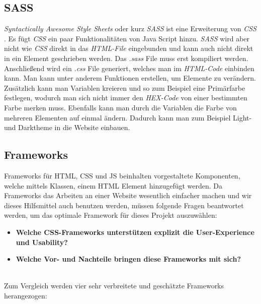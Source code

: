 	\subsection{SASS}
	\label{chapter:study-frontend-sass}
	\textit{Syntactically Awesome Style Sheets} oder kurz \textit{SASS} ist eine Erweiterung von \textit{CSS} \cite{jump-start-sass}. Es fügt \textit{CSS} ein paar Funktionalitäten von Java Script hinzu. \textit{SASS} wird aber nicht wie \textit{CSS} direkt in das \textit{HTML-File} eingebunden und kann auch nicht direkt in ein Element geschrieben werden. Das \textit{.sass} File muss erst kompiliert werden. Anschließend wird ein \textit{.css} File generiert, welches man im \textit{HTML-Code} einbinden kann. Man kann unter anderem Funktionen erstellen, um Elemente zu verändern. Zusätzlich kann man Variablen kreieren und so zum Beispiel eine Primärfarbe festlegen, wodurch man sich nicht immer den \textit{HEX-Code} von einer bestimmten Farbe merken muss. Ebenfalls kann man durch die Variablen die Farbe von mehreren Elementen auf einmal ändern. Dadurch kann man zum Beispiel Light- und Darktheme in die Website einbauen.

	
	
	\subsection{Frameworks}
	\label{chapter:study-frontend-frameworks}
	Frameworks für HTML, CSS und JS beinhalten vorgestaltete Komponenten, welche mittels Klassen, einem HTML Element hinzugefügt werden. Da Frameworks das Arbeiten an einer Website wesentlich einfacher machen und wir dieses Hilfsmittel auch benutzen werden, müssen folgende Fragen beantwortet werden, um das optimale Framework für dieses Projekt auszuwählen:
	\begin{itemize}
		\item \textbf{Welche CSS-Frameworks unterstützen explizit die User-Experience und Usability?}
		\item \textbf{Welche Vor- und Nachteile bringen diese Frameworks mit sich?}
	\end{itemize}
\label{list:fragenframeworks} ~\\
	Zum Vergleich werden vier sehr verbreitete und geschätzte Frameworks herangezogen:
